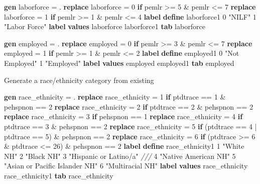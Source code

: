 \documentclass[
]{book}
\newenvironment{Shaded}{\begin{snugshade}}{\end{snugshade}}
\newcommand{\CommentTok}[1]{\textcolor[rgb]{0.56,0.35,0.01}{\textit{#1}}}
\newcommand{\KeywordTok}[1]{\textcolor[rgb]{0.13,0.29,0.53}{\textbf{#1}}}
\newcommand{\NormalTok}[1]{#1}
\newcommand{\StringTok}[1]{\textcolor[rgb]{0.31,0.60,0.02}{#1}}
\begin{document}
\begin{Shaded}
\begin{Highlighting}[]
\KeywordTok{gen}\NormalTok{ laborforce = .}
\KeywordTok{replace}\NormalTok{ laborforce = 0 }\KeywordTok{if}\NormalTok{ pemlr \textgreater{}= 5 \& pemlr \textless{}= 7}
\KeywordTok{replace}\NormalTok{ laborforce = 1 }\KeywordTok{if}\NormalTok{ pemlr \textgreater{}= 1 \& pemlr \textless{}= 4}
\KeywordTok{label} \KeywordTok{define}\NormalTok{ laborforce1 0 }\StringTok{"NILF"}\NormalTok{ 1 }\StringTok{"Labor Force"}
\KeywordTok{label} \KeywordTok{values}\NormalTok{ laborforce laborforce1}
\KeywordTok{tab}\NormalTok{ laborforce}

\KeywordTok{gen}\NormalTok{ employed = .}
\KeywordTok{replace}\NormalTok{ employed = 0 }\KeywordTok{if}\NormalTok{ pemlr \textgreater{}= 3 \& pemlr \textless{}= 7}
\KeywordTok{replace}\NormalTok{ employed = 1 }\KeywordTok{if}\NormalTok{ pemlr \textgreater{}= 1 \& pemlr \textless{}= 2}
\KeywordTok{label} \KeywordTok{define}\NormalTok{ employed1 0 }\StringTok{"Not Employed"}\NormalTok{ 1 }\StringTok{"Employed"}
\KeywordTok{label} \KeywordTok{values}\NormalTok{ employed employed1}
\KeywordTok{tab}\NormalTok{ employed}
\end{Highlighting}
\end{Shaded}

Generate a race/ethnicity category from existing

\begin{Shaded}
\begin{Highlighting}[]
\KeywordTok{gen}\NormalTok{ race\_ethnicity = .}
\KeywordTok{replace}\NormalTok{ race\_ethnicity = 1 }\KeywordTok{if}\NormalTok{ ptdtrace == 1 \& pehspnon == 2}
\KeywordTok{replace}\NormalTok{ race\_ethnicity = 2 }\KeywordTok{if}\NormalTok{ ptdtrace == 2 \& pehspnon == 2 }
\KeywordTok{replace}\NormalTok{ race\_ethnicity = 3 }\KeywordTok{if}\NormalTok{ pehspnon == 1}
\KeywordTok{replace}\NormalTok{ race\_ethnicity = 4 }\KeywordTok{if}\NormalTok{ ptdtrace == 3 \& pehspnon == 2}
\KeywordTok{replace}\NormalTok{ race\_ethnicity = 5 }\KeywordTok{if}\NormalTok{ (ptdtrace == 4 | ptdtrace == 5) \& pehspnon == 2}
\KeywordTok{replace}\NormalTok{ race\_ethnicity = 6 }\KeywordTok{if}\NormalTok{ (ptdtrace \textgreater{}= 6 \& ptdtrace \textless{}= 26) \& pehspnon == 2}
\KeywordTok{label} \KeywordTok{define}\NormalTok{ race\_ethnicity1 1 }\StringTok{"White NH"}\NormalTok{ 2 }\StringTok{"Black NH"}\NormalTok{ 3 }\StringTok{"Hispanic or Latino/a"} \CommentTok{///}
\NormalTok{4 }\StringTok{"Native American NH"}\NormalTok{ 5 }\StringTok{"Asian or Pacific Islander NH"}\NormalTok{ 6 }\StringTok{"Multiracial NH"}
\KeywordTok{label} \KeywordTok{values}\NormalTok{ race\_ethnicity race\_ethnicity1}
\KeywordTok{tab}\NormalTok{ race\_ethnicity }
\end{Highlighting}
\end{Shaded}
\end{document}
